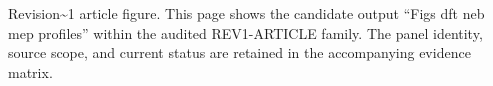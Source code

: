 Revision\textasciitilde{}1 article figure. This page shows the candidate output ``Figs dft neb mep profiles'' within the audited REV1-ARTICLE family. The panel identity, source scope, and current status are retained in the accompanying evidence matrix.

